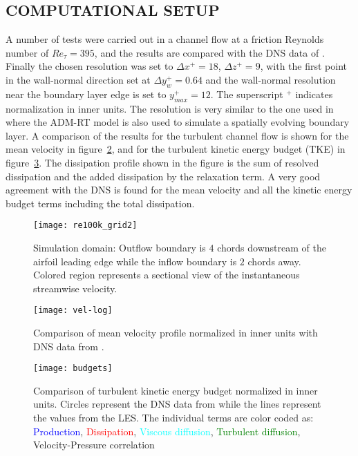\documentclass[twocolumn,10pt]{tsfp}
\begin{document}
\subsection*{COMPUTATIONAL SETUP}
A number of tests were carried out in a channel flow at a friction Reynolds number of $Re_{\tau}=395$, and the results are compared with the DNS data of \cite{moser99}. Finally the chosen resolution was set to $\Delta x^{+}=18$, $\Delta z^{+}=9$, with the first point in the wall-normal direction set at $\Delta y_{w}^{+}=0.64$ and the wall-normal resolution near the boundary layer edge is set to $y_{max}^{+}=12$. The superscript $^{+}$ indicates normalization in inner units. The resolution is very similar to the one used in \cite{eitel14} where the ADM-RT model is also used to simulate a spatially evolving boundary layer. A comparison of the results for the turbulent channel flow is shown for the mean velocity in figure~\ref{fig:vel_mean}, and for the turbulent kinetic energy budget (TKE) in figure~\ref{fig:budget}. The dissipation profile shown in the figure is the sum of resolved dissipation and the added dissipation by the relaxation term. A very good agreement with the DNS is found for the mean velocity and all the kinetic energy budget terms including the total dissipation.
\begin{figure}[t]
	\centering
	\texttt{[image: re100k\_grid2]}
	\caption{Simulation domain: Outflow boundary is $4$ chords downstream of the airfoil leading edge while the inflow boundary is $2$ chords away. Colored region represents a sectional view of the instantaneous streamwise velocity.}
	\label{fig:re100k_domain}
\end{figure}
\begin{figure}[t]
	\centering
	\texttt{[image: vel-log]}
	\caption{Comparison of mean velocity profile normalized in inner units with DNS data from \cite{moser99}.}
	\label{fig:vel_mean}
\end{figure}
\begin{figure}[t]
	\centering
	\texttt{[image: budgets]}
	\caption{Comparison of turbulent kinetic energy budget normalized in inner units. Circles represent the DNS data from \cite{moser99} while the lines represent the values from the LES. The individual terms are color coded as: \textcolor{blue}{Production}, \textcolor{red}{Dissipation}, \textcolor{cyan}{Viscous diffusion}, \textcolor{green}{Turbulent diffusion}, \textcolor{mygray}{Velocity-Pressure correlation}}
	\label{fig:budget}
\end{figure}
\end{document}
